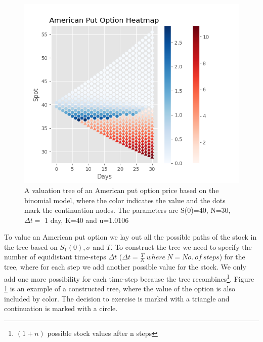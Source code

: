 \begin{figure}[th]
\centering
\includegraphics{Figures/BinomialTree.png}
\decoRule
\caption[Binomial Tree]{A valuation tree of an American put option price based on the binomial model, where the color indicates the value and the dots mark the continuation nodes. The parameters are S(0)=40, N=30, $\Delta t =$ 1 day, K=40 and u=1.0106}
\label{fig:BinomialTree}
\end{figure}

To value an American put option we lay out all the possible paths of the stock in the tree based on $S_1(0),\sigma$ and $T$. To construct the tree we need to specify the number of equidistant time-steps $\Delta t$ ($\Delta t = \frac{T}{N} \ where \ N=No. \ of  \ steps$) for the tree, where for each step we add another possible value for the stock. We only add one more possibility for each time-step because the tree recombines\footnote{$(1+n)$ possible stock values after n steps}. Figure \ref{fig:BinomialTree} is an example of a constructed tree, where the value of the option is also included by color. The decision to exercise is marked with a triangle and continuation is marked with a circle. \\

